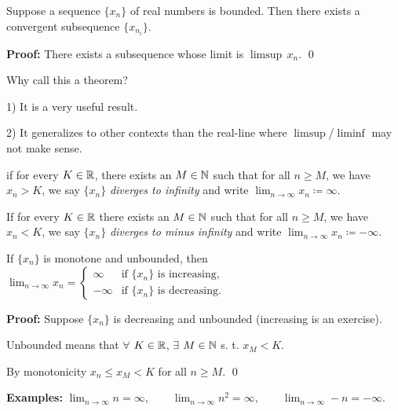 \documentclass[10pt,aspectratio=149]{beamer}
\begin{document}
\begin{frame}

\begin{theorem}
Suppose a sequence $\{ x_n \}$ of real numbers is bounded.
Then there exists a convergent subsequence $\{ x_{n_i} \}$.
\end{theorem}

\pause
\textbf{Proof:}
There exists a subsequence whose limit is $\limsup \, x_n$.
\qed

\pause
\medskip

Why call this a theorem?

\pause
\medskip

1) It is a very useful result.

\pause
\medskip

2) It generalizes to other contexts than the real-line where
$\limsup$/$\liminf$ may not make sense.


\end{frame}

\begin{frame}

\begin{definition}
if for every $K \in {\mathbb{R}}$, there exists an $M \in {\mathbb{N}}$ such that
for all $n \geq M$, we have $x_n > K$,
we say $\{ x_n \}$ \emph{diverges to infinity} and write
\quad
$\displaystyle \lim_{n \to \infty} x_n \coloneqq \infty$.

\pause
\medskip

If for every $K \in {\mathbb{R}}$ there exists an $M \in {\mathbb{N}}$ such that
for all $n \geq M$, we have $x_n < K$,
we say $\{ x_n \}$ \emph{diverges to minus infinity} and write
\quad
$\displaystyle \lim_{n \to \infty} x_n \coloneqq -\infty$.
\end{definition}


\pause

\begin{proposition}
If $\{ x_n \}$ is monotone and unbounded, then
$\displaystyle
\lim_{n \to \infty} x_n =
\begin{cases}
\infty  & \text{if } \{ x_n \} \text{ is increasing,} \\
-\infty & \text{if } \{ x_n \} \text{ is decreasing.}
\end{cases}
$
\end{proposition}

\pause
\textbf{Proof:}
Suppose $\{x_n\}$ is decreasing and unbounded (increasing is an exercise).

\pause
Unbounded means that $\forall$ $K \in {\mathbb{R}}$, $\exists$ $M \in {\mathbb{N}}$ s. t. $x_M < K$.

\pause
By monotonicity $x_n \leq x_M < K$ for all $n \geq M$.
\qed

\pause
\medskip

\textbf{Examples:}
$\displaystyle \lim_{n\to \infty} n = \infty,
\qquad 
\lim_{n\to \infty} n^2 = \infty,
\qquad 
\lim_{n\to \infty} -n = -\infty$.
\end{frame}
\end{document}
